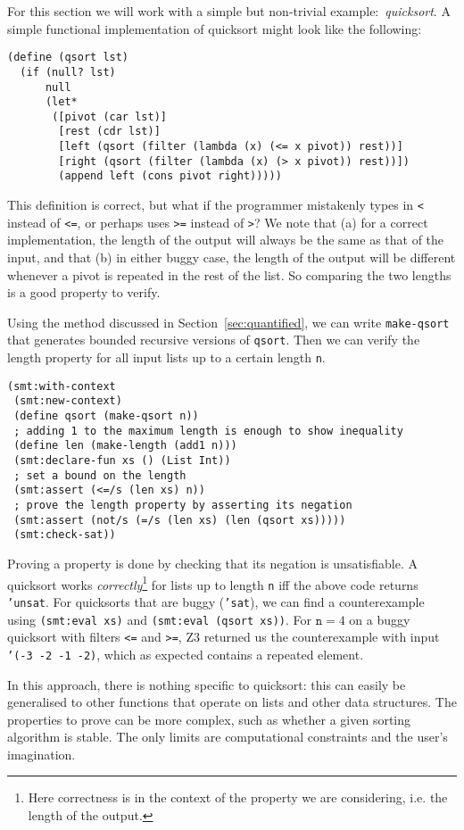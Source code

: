 For this section we will work with a simple but non-trivial
example:~\textit{quicksort}. A simple functional implementation of quicksort
might look like the following:

\begin{verbatim}
(define (qsort lst)
  (if (null? lst)
      null
      (let*
       ([pivot (car lst)]
        [rest (cdr lst)]
        [left (qsort (filter (lambda (x) (<= x pivot)) rest))]
        [right (qsort (filter (lambda (x) (> x pivot)) rest))])
        (append left (cons pivot right)))))
\end{verbatim}

This definition is correct, but what if the programmer mistakenly types in
\texttt{<} instead of \texttt{<=}, or perhaps uses \texttt{>=} instead of
\texttt{>}? We note that (a) for a correct implementation, the length of the
output will always be the same as that of the input, and that (b) in either
buggy case, the length of the output will be different whenever a pivot is
repeated in the rest of the list. So comparing the two lengths is a good
property to verify.

Using the method discussed in Section~\ref{sec:quantified}, we can write
\texttt{make-qsort} that generates bounded recursive versions of
\texttt{qsort}. Then we can verify the length property for all input lists up
to a certain length \texttt{n}.

\begin{verbatim}
(smt:with-context
 (smt:new-context)
 (define qsort (make-qsort n))
 ; adding 1 to the maximum length is enough to show inequality
 (define len (make-length (add1 n)))
 (smt:declare-fun xs () (List Int))
 ; set a bound on the length
 (smt:assert (<=/s (len xs) n))
 ; prove the length property by asserting its negation
 (smt:assert (not/s (=/s (len xs) (len (qsort xs)))))
 (smt:check-sat))
\end{verbatim}

Proving a property is done by checking that its negation is unsatisfiable. A
quicksort works \textit{correctly}\footnote{Here correctness is in the context
of the property we are considering, i.e. the length of the output.} for lists
up to length \texttt{n} iff the above code returns \texttt{'unsat}. For
quicksorts that are buggy (\texttt{'sat}), we can find a counterexample using
\texttt{(smt:eval xs)} and \texttt{(smt:eval (qsort xs))}. For $\mathtt{n}=4$
on a buggy quicksort with filters \texttt{<=} and \texttt{>=}, Z3 returned us
the counterexample with input \texttt{'(-3 -2 -1 -2)}, which as expected
contains a repeated element.

In this approach, there is nothing specific to quicksort: this can easily be
generalised to other functions that operate on lists and other data
structures. The properties to prove can be more complex, such as whether a
given sorting algorithm is stable. The only limits are computational
constraints and the user's imagination.
